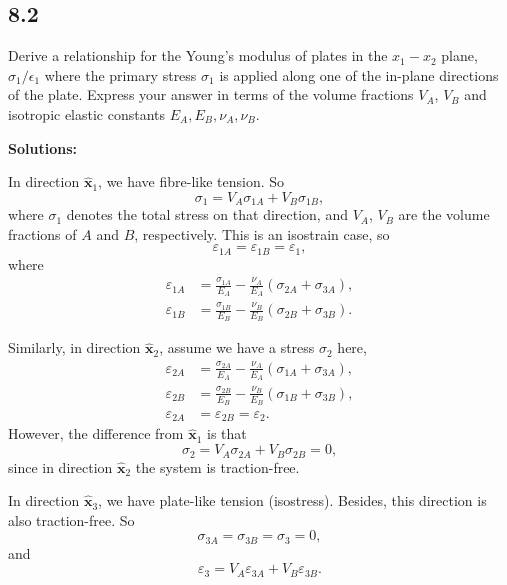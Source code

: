 \documentclass[12pt]{article}
\begin{document}
\subsection{8.2}
Derive a relationship for the Young's modulus of plates in the $x_1 - x_2$ plane,
$\sigma_1/\epsilon_1$ where the primary stress $\sigma_1$ is applied along one of
the in-plane directions of the plate. Express your answer in terms of the volume
fractions $V_A$, $V_B$ and isotropic elastic constants $E_A, E_B, \nu_A, \nu_B$.

\textbf{Solutions:}

In direction $\hat{\bm{x}}_1$, we have fibre-like tension. So
\begin{equation}\label{eq:sg11}
  \sigma_{1} = V_A \sigma_{1A} + V_B \sigma_{1B},
\end{equation}
where $\sigma_{1}$ denotes the total stress on that direction, and
$V_A$, $V_B$ are the volume fractions of $A$ and $B$, respectively.
This is an isostrain case, so
\begin{equation}
  \varepsilon_{1A} = \varepsilon_{1B} = \varepsilon_{1},
\end{equation}
where
\begin{align}
  \varepsilon_{1A} & = \frac{ \sigma_{1A} }{ E_A } - \frac{ \nu_A }{ E_A } (\sigma_{2A} + \sigma_{3A}), \\
  \varepsilon_{1B} & = \frac{ \sigma_{1B} }{ E_B } - \frac{ \nu_B }{ E_B } (\sigma_{2B} + \sigma_{3B}).
\end{align}

Similarly, in direction $\hat{\bm{x}}_2$, assume we have a stress $\sigma_{2}$ here,
\begin{align}
  \varepsilon_{2A} & = \frac{ \sigma_{2A} }{ E_A } - \frac{ \nu_A }{ E_A } (\sigma_{1A} + \sigma_{3A}), \\
  \varepsilon_{2B} & = \frac{ \sigma_{2B} }{ E_B } - \frac{ \nu_B }{ E_B } (\sigma_{1B} + \sigma_{3B}), \\
  \varepsilon_{2A} & = \varepsilon_{2B} = \varepsilon_{2}.
\end{align}
However, the difference from $\hat{\bm{x}}_1$ is that
\begin{equation}
  \sigma_{2} = V_A \sigma_{2A} + V_B \sigma_{2B} = 0,
\end{equation}
since in direction $\hat{\bm{x}}_2$ the system is traction-free.

In direction $\hat{\bm{x}}_3$,
we have plate-like tension (isostress). Besides,
this direction is also traction-free. So
\begin{equation}
  \sigma_{3A} = \sigma_{3B} = \sigma_{3} = 0,
\end{equation}
and
\begin{equation}\label{eq:ep33}
  \varepsilon_{3} = V_A \varepsilon_{3A} + V_B \varepsilon_{3B}.
\end{equation}
\end{document}
